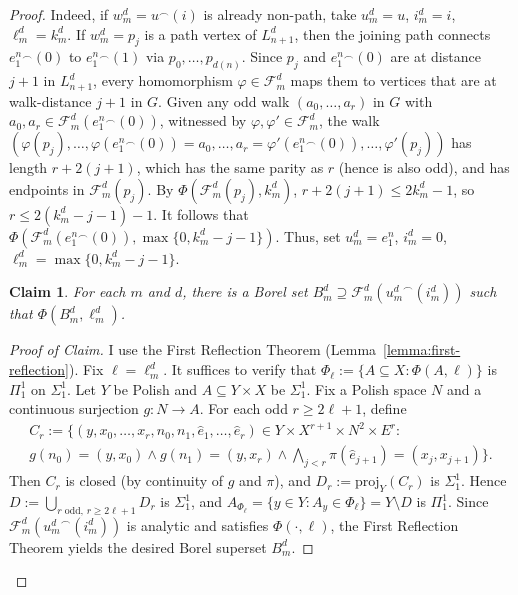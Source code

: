 \documentclass[11pt]{article}
\theoremstyle{plain}
\newtheorem{claim}{Claim}[theorem] %
\theoremstyle{definition}
\theoremstyle{remark}
\newenvironment{claimproof}[1][Proof of Claim]{
    \begin{proof}[#1]
    \renewcommand{\qedsymbol}{$\openbox$} %
}{
    \end{proof}
}
\begin{document}
\begin{proof}
    Indeed, if $w^d_m=u^\smallfrown(i)$ is already non-path, take $u^d_m=u$, $i^d_m=i$, $\ell^d_m=k^d_m$.
    If $w^d_m=p_j$ is a path vertex of $L^d_{n+1}$, then the joining path connects $e_1^n{}^\smallfrown(0)$ to $e_1^n{}^\smallfrown(1)$ via $p_0,\dots,p_{d(n)}$.
    Since $p_j$ and $e_1^n{}^\smallfrown(0)$ are at distance $j+1$ in $L^d_{n+1}$, every homomorphism $\varphi\in\mathcal F^d_m$ maps them to vertices that are at walk-distance $j+1$ in $G$.
    Given any odd walk $(a_0,\dots,a_r)$ in $G$ with $a_0,a_r\in\mathcal F^d_m(e_1^n{}^\smallfrown(0))$, witnessed by $\varphi,\varphi'\in\mathcal F^d_m$, the walk $(\varphi(p_j),\dots,\varphi(e_1^n{}^\smallfrown(0))=a_0,\dots,a_r=\varphi'(e_1^n{}^\smallfrown(0)),\dots,\varphi'(p_j))$ has length $r+2(j+1)$, which has the same parity as $r$ (hence is also odd), and has endpoints in $\mathcal F^d_m(p_j)$.
    By $\Phi(\mathcal F^d_m(p_j),k^d_m)$, $r+2(j+1)\leq 2k^d_m-1$, so $r\leq 2(k^d_m-j-1)-1$.
    It follows that $\Phi(\mathcal F^d_m(e_1^n{}^\smallfrown(0)),\max\{0,k^d_m-j-1\})$.
    Thus, set $u^d_m=e_1^n$, $i^d_m=0$, $\ell^d_m=\max\{0,k^d_m-j-1\}$.
    
    \begin{claim}
        For each $m$ and $d$, there is a Borel set $B^d_m\supseteq\mathcal F^d_m({u^d_m}^\smallfrown(i^d_m))$ such that $\Phi(B^d_m,\ell^d_m)$.
    \end{claim}

    \begin{claimproof}
        I use the First Reflection Theorem (Lemma~\ref{lemma:first-reflection}).
        Fix $\ell=\ell^d_m$.
        It suffices to verify that $\Phi_\ell:=\{A\subseteq X:\Phi(A,\ell)\}$ is $\Pi^1_1$ on $\Sigma^1_1$.
        Let $Y$ be Polish and $A\subseteq Y\times X$ be $\Sigma^1_1$.
        Fix a Polish space $N$ and a continuous surjection $g\colon N\to A$.
        For each odd $r\geq 2\ell+1$, define
        \begin{align*}
            C_r:=\{(y,x_0,\dots,x_r,n_0,n_1,\hat e_1,\dots,\hat e_r)\in Y\times X^{r+1}\times N^2\times E^r:{}\\
            g(n_0)=(y,x_0)\land g(n_1)=(y,x_r)\land\textstyle\bigwedge_{j<r}\pi(\hat e_{j+1})=(x_j,x_{j+1})\}.
        \end{align*}
        Then $C_r$ is closed (by continuity of $g$ and $\pi$), and $D_r:=\mathrm{proj}_Y(C_r)$ is $\Sigma^1_1$.
        Hence $D:=\bigcup_{r\text{ odd},\,r\geq 2\ell+1}D_r$ is $\Sigma^1_1$, and
        $A_{\Phi_\ell}=\{y\in Y:A_y\in\Phi_\ell\}=Y\setminus D$
        is $\Pi^1_1$.
        Since $\mathcal F^d_m({u^d_m}^\smallfrown(i^d_m))$ is analytic and satisfies $\Phi(\cdot,\ell)$, the First Reflection Theorem yields the desired Borel superset $B^d_m$.
    \end{claimproof}


\end{proof}
\end{document}
